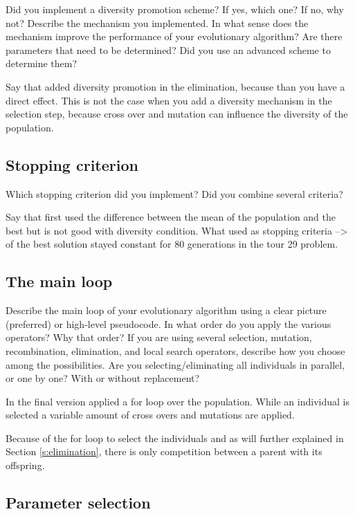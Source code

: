 \documentclass[a4paper,10pt]{article}
\newcommand{\ReplaceMe}[1]{{\color{blue}#1}}
\begin{document}
\ReplaceMe{Did you implement a diversity promotion scheme? If yes, which one? If no, why not? Describe the mechanism you implemented. In what sense does the mechanism improve the performance of your evolutionary algorithm? Are there parameters that need to be determined? Did you use an advanced scheme to determine them?}

Say that added diversity promotion in the elimination, because than you have a direct effect. This is not the case when you add a diversity mechanism in the selection step, because cross over and mutation can influence the diversity of the population. 

\subsection{Stopping criterion}

\ReplaceMe{Which stopping criterion did you implement? Did you combine several criteria?}

Say that first used the difference between the mean of the population and the best but is not good with diversity condition. What used as stopping criteria --> of the best solution stayed constant for 80 generations in the tour 29 problem. 

\subsection{The main loop}

\ReplaceMe{Describe the main loop of your evolutionary algorithm using a clear picture (preferred) or high-level pseudocode. In what order do you apply the various operators? Why that order? If you are using several selection, mutation, recombination, elimination, and local search operators, describe how you choose among the possibilities. Are you selecting/eliminating all individuals in parallel, or one by one? With or without replacement?}

In the final version applied a for loop over the population. While an individual is selected a variable amount of cross overs and mutations are applied. 

Because of the for loop to select the individuals and as will further explained in Section \ref{s:elimination}, there is only competition between a parent with its offspring. 



\subsection{Parameter selection}
\end{document}
